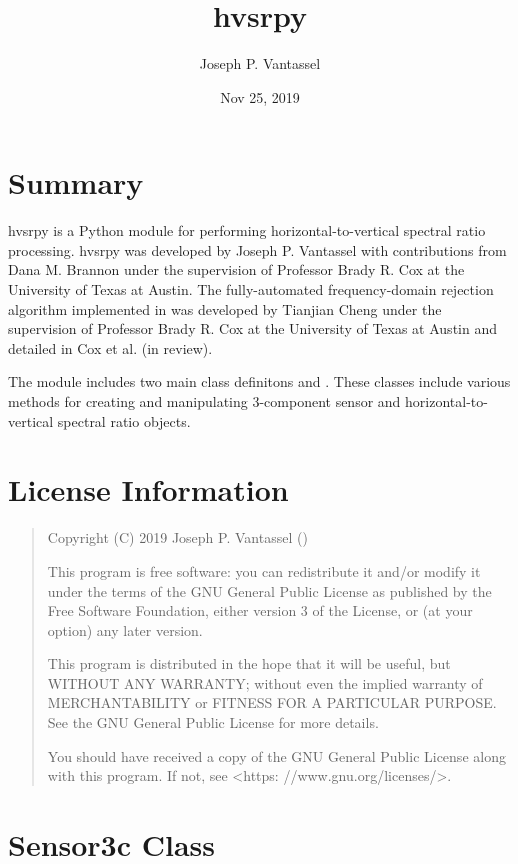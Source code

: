 \documentclass[letterpaper,10pt,english,openany,oneside]{sphinxmanual}
\title{hvsrpy}
\date{Nov 25, 2019}
\author{Joseph P.\@{} Vantassel}
\begin{document}
\pagestyle{empty}
\sphinxmaketitle
\pagestyle{plain}
\sphinxtableofcontents
\pagestyle{normal}
\label{\detokenize{index::doc}}



\chapter{Summary}
\label{\detokenize{index:summary}}
hvsrpy is a Python module for performing horizontal-to-vertical spectral ratio
processing. hvsrpy was developed by Joseph P. Vantassel with contributions
from Dana M. Brannon under the supervision of Professor Brady R. Cox at the
University of Texas at Austin. The fully-automated frequency-domain rejection
algorithm implemented in  was developed by Tianjian Cheng under the
supervision of Professor Brady R. Cox at the University of Texas at Austin and
detailed in Cox et al. (in review).

The module includes two main class definitons  and . These
classes include various methods for creating and manipulating 3-component
sensor and horizontal-to-vertical spectral ratio objects.


\chapter{License Information}
\label{\detokenize{index:license-information}}\begin{quote}

Copyright (C) 2019 Joseph P. Vantassel ()

This program is free software: you can redistribute it and/or modify
it under the terms of the GNU General Public License as published by
the Free Software Foundation, either version 3 of the License, or
(at your option) any later version.

This program is distributed in the hope that it will be useful,
but WITHOUT ANY WARRANTY; without even the implied warranty of
MERCHANTABILITY or FITNESS FOR A PARTICULAR PURPOSE.  See the
GNU General Public License for more details.

You should have received a copy of the GNU General Public License
along with this program.  If not, see \textless{}https: //www.gnu.org/licenses/\textgreater{}.
\end{quote}


\chapter{Sensor3c Class}
\label{\detokenize{index:sensor3c-class}}
\end{document}
